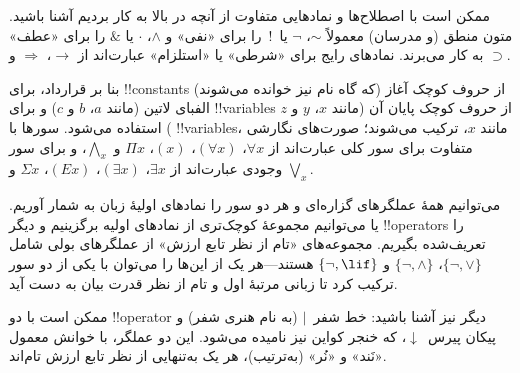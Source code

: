 \documentclass[../../../include/open-logic-section]{subfiles}
\begin{document}

\begin{intro}
ممکن است با اصطلاح‌ها و نمادهایی متفاوت از آنچه در بالا به کار بردیم آشنا
باشید. متون منطق (و مدرسان) معمولاً $\sim$، $\neg$ یا~!\ را برای «نفی» و
$\wedge$، $\cdot$ یا $\&$ را برای «عطف» به کار می‌برند. نمادهای رایج برای
«شرطی» یا «استلزام» عبارت‌اند از $\rightarrow$، $\Rightarrow$ و $\supset$.

بنا بر قرارداد، برای !!{constant}s (که گاه نام نیز خوانده می‌شوند) از حروف
کوچک آغاز الفبای لاتین (مانند $a$، $b$ و $c$) و برای !!{variable}s از حروف
کوچک پایان آن (مانند $x$، $y$ و $z$) استفاده می‌شود. سورها با
!!{variable}s، مانند $x$، ترکیب می‌شوند؛ صورت‌های نگارشی متفاوت برای سور
کلی عبارت‌اند از $\forall x$، $(\forall x)$، $(x)$، $\Pi x$ و
$\bigwedge_x$، و برای سور وجودی عبارت‌اند از $\exists x$، $(\exists
x)$، $(Ex)$، $\Sigma x$ و $\bigvee_x$.
\end{intro}

\begin{explain}
می‌توانیم همهٔ عملگرهای گزاره‌ای و هر دو سور را نمادهای اولیهٔ زبان به شمار
آوریم. یا می‌توانیم مجموعهٔ کوچک‌تری از نمادهای اولیه برگزینیم و دیگر
!!{operator}s را تعریف‌شده بگیریم. مجموعه‌های «تام از نظر تابع ارزش» از
عملگرهای بولی شامل $\{ \lnot, \lor \}$، $\{ \lnot, \land \}$ و
$\{ \lnot, \lif\}$ هستند---هر یک از این‌ها را می‌توان با یکی از دو سور
ترکیب کرد تا زبانی مرتبهٔ اول و تام از نظر قدرت بیان به دست آید.

ممکن است با دو !!{operator} دیگر نیز آشنا باشید: خط شفر~$|$ (به نام هنری
شفر) و پیکان پیرس~$\downarrow$، که خنجر کواین نیز نامیده می‌شود. این دو
عملگر، با خوانش معمول «نَند» و «نُر» (به‌ترتیب)، هر یک به‌تنهایی از نظر
تابع ارزش تام‌اند.
\end{explain}
\end{document}
